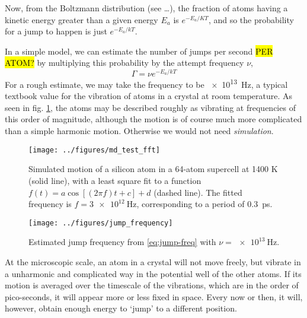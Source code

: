 \documentclass[11pt,bibliography=totoc,index=totoc]{scrbook}   %
\newcommand{\comment}[1]{\hl{#1}}
\begin{document}
Now, from the Boltzmann distribution (see \ldots), the fraction of atoms having a kinetic energy greater than a given energy $E_a$ is $e^{-E_a/KT}$, and so the probability for a jump to happen is just $e^{-E_a/kT}$. 

In a simple model, we can estimate the number of jumps per second \comment{PER ATOM?} by multiplying this probability by the attempt frequency $\nu$,
\begin{equation}
  \Gamma = \nu e^{-E_a/kT}
  \label{eq:jump-freq}
\end{equation}
For a rough estimate, we may take the frequency to be \SI{e13}{\hertz}, a typical textbook value for the vibration of atoms in a crystal at room temperature.
As seen in fig. \ref{fig:figures/md_test_fft}, the atoms may be described roughly as vibrating at frequencies of this order of magnitude, although the motion is of course much more complicated than a simple harmonic motion. Otherwise we would not need \emph{simulation}.

\begin{figure}[htbp]
  \begin{center}
    \texttt{[image: ../figures/md\_test\_fft]}
  \end{center}
  \caption{
    Simulated motion of a silicon atom in a 64-atom supercell at 1400 K (solid line), 
    with a least square fit to a function $f(t) = a \cos[(2\pi f)t + c] + d$ (dashed line). 
    The fitted frequency is $f=\SI{3e12}{\hertz}$, corresponding to a period of 0.3~ps.
  }
  \label{fig:figures/md_test_fft}
\end{figure}

\begin{figure}[htbp]
  \begin{center}
    \texttt{[image: ../figures/jump\_frequency]}
  \end{center}
  \caption{Estimated jump frequency from \eqref{eq:jump-freq} with $\nu=\SI{e13}{\hertz}$.}
  \label{fig:../figures/jump_frequency}
\end{figure}




At the microscopic scale, an atom in a crystal will not move freely, but vibrate in a unharmonic and complicated way in the potential well of the other atoms. 
If its motion is averaged over the timescale of the vibrations, which are in the order of pico-seconds, it will appear more or less fixed in space. 
Every now or then, it will, however, obtain enough energy to `jump' to a different position.
\end{document}
